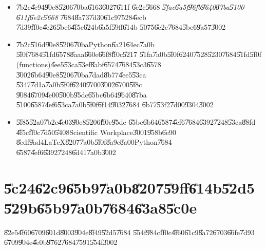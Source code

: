 \documentclass[12pt,a4paper]{article}
\begin{document}
\begin{itemize}
\item \U{7b2c}\U{4e94}\U{90e8}\U{5206}\U{70ba}\U{6163}\U{6027}\U{611f}%
\U{6e2c}\U{5668} \textit{\U{5fae}\U{6a5f}\U{96fb}\U{9640}\U{87ba}\U{5100}%
\U{611f}\U{6e2c}\U{5668} }\U{7684}\U{8a73}\U{7d30}\U{61c9}\U{7528}\U{4ecb}%
\U{7d39}\U{ff0c}\U{4e26}\U{5be6}\U{4f5c}\U{624b}\U{6a5f}\U{59ff}\U{614b}%
\U{5075}\U{6e2c}\U{7684}\U{5be6}\U{9a57}\U{3002}

\item \U{7b2c}\U{516d}\U{90e8}\U{5206}\U{70ba}Python\U{6a21}\U{64ec}\U{7a0b}%
\U{5f0f}\U{7684}\U{51fd}\U{6578}\U{8aaa}\U{660e}\U{66f8}\U{ff0c}\U{5217}%
\U{51fa}\U{7a0b}\U{5f0f}\U{6240}\U{7528}\U{5230}\U{7684}\U{51fd}\U{5f0f}%
(functions)\U{4ee5}\U{53ca}\U{53ef}\U{8abf}\U{6574}\U{7684}\U{53c3}\U{6578}%
\U{3002}\U{6b64}\U{90e8}\U{5206}\U{70ba}\U{7dad}\U{8b77}\U{4ee5}\U{53ca}%
\U{5347}\U{7d1a}\U{7a0b}\U{5f0f}\U{6240}\U{9700}\U{3002}\U{6700}\U{5f8c}%
\U{9084}\U{6709}\U{4e00}\U{500b}\U{95dc}\U{65bc}\U{6b64}\U{9640}\U{87ba}%
\U{5100}\U{6587}\U{4ef6}\U{53ca}\U{7a0b}\U{5f0f}\U{6f14}\U{9032}\U{7684}%
\U{6b77}\U{53f2}\U{7d00}\U{9304}\U{3002}

\item \U{5f85}\U{52a0}\U{7b2c}\U{4e03}\U{90e8}\U{5206}\U{ff0c}\U{95dc}%
\U{65bc}\U{6b64}\U{6587}\U{4ef6}\U{7684}\U{6392}\U{7248}\U{53ca}\U{88fd}%
\U{4f5c}\U{ff0c}\U{7d50}\U{5408}Scientific Workplace\U{3001}\U{958b}\U{6e90}%
\U{8edf}\U{9ad4}LaTeX\U{8207}\U{7a0b}\U{5f0f}\U{8a9e}\U{8a00}Python\U{7684}%
\U{6587}\U{4ef6}\U{6392}\U{7248}\U{6d41}\U{7a0b}\U{3002}
\end{itemize}

%

\part{\U{5c24}\U{62c9}\U{65b9}\U{7a0b}\U{8207}\U{59ff}\U{614b}\U{52d5}%
\U{529b}\U{65b9}\U{7a0b}\U{7684}\U{63a8}\U{5c0e}}

\setcounter{page}{1}\bigskip

\U{82e5}\U{4f60}\U{6709}\U{601d}\U{8003}\U{904e}\U{8f49}\U{52d5}\U{7684}%
\U{554f}\U{984c}\U{ff0c}\U{4f60}\U{61c9}\U{8a72}\U{6703}\U{66fe}\U{7d93}%
\U{6709}\U{904e}\U{4e0b}\U{9762}\U{7684}\U{7591}\U{554f}\U{3002}
\end{document}
